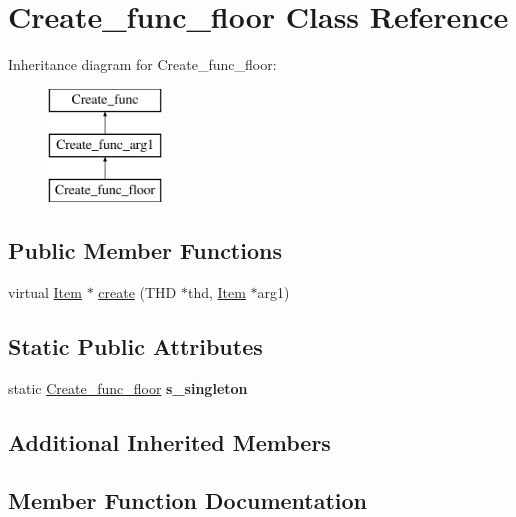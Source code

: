 \hypertarget{classCreate__func__floor}{}\section{Create\+\_\+func\+\_\+floor Class Reference}
\label{classCreate__func__floor}
Inheritance diagram for Create\+\_\+func\+\_\+floor\+:\begin{figure}[H]
\begin{center}
\leavevmode
\includegraphics[height=3.000000cm]{classCreate__func__floor}
\end{center}
\end{figure}
\subsection*{Public Member Functions}
\begin{DoxyCompactItemize}
\item 
virtual \mbox{\hyperlink{classItem}{Item}} $\ast$ \mbox{\hyperlink{classCreate__func__floor_a14de923ce9b377799efd34232653839c}{create}} (T\+HD $\ast$thd, \mbox{\hyperlink{classItem}{Item}} $\ast$arg1)
\end{DoxyCompactItemize}
\subsection*{Static Public Attributes}
\begin{DoxyCompactItemize}
\item 
\mbox{\label{classCreate__func__floor_adcb31e80babb033c451afaa19f890adc}} 
static \mbox{\hyperlink{classCreate__func__floor}{Create\+\_\+func\+\_\+floor}} {\bfseries s\+\_\+singleton}
\end{DoxyCompactItemize}
\subsection*{Additional Inherited Members}


\subsection{Member Function Documentation}
\mbox{\label{classCreate__func__floor_a14de923ce9b377799efd34232653839c}} 
